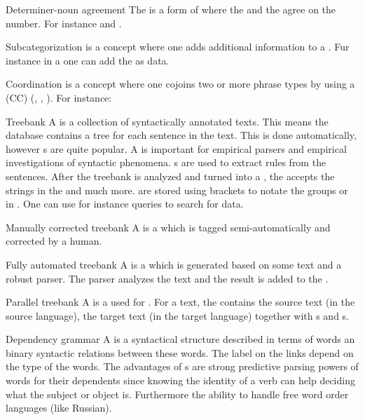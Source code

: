 \begin{df}{Determiner-noun agreement}
The \sb{} is a form of  where the  and the  agree on the number. For instance  and .
\end{df}
\begin{df}{Subcategorization}
\sb{} is a concept where one adds additional information to a . Fur instance in a  one can add the  as data.
\end{df}
\begin{df}{Coordination}
\sb{} is a concept where one cojoins two or more phrase types by using a  (CC) (, , ). For instance:
\end{df}
\begin{df}{Treebank}
A \sb{} is a collection of syntactically annotated texts. This means the database contains a tree for each sentence in the text. This is done automatically, however s are quite popular. A \sb{} is important for empirical parsers and empirical investigations of syntactic phenomena. \sb{}s are used to extract  rules from the sentences. After the treebank is analyzed and turned into a , the  accepts the strings in the \sb{} and much more. \sb{} are stored using brackets to notate the groups or in . One can use for instance  queries to search for data.
\end{df}
\begin{df}{Manually corrected treebank}
A \sb{} is a  which is tagged semi-automatically and corrected by a human.
\end{df}
\begin{df}{Fully automated treebank}
A \sb{} is a  which is generated based on some text and a robust parser. The parser analyzes the text and the result is added to the .
\end{df}
\begin{df}{Parallel treebank}
A \sb{} is a  used for . For a text, the  contains the source text (in the source language), the target text (in the target language) together with s and s.
\end{df}
\begin{df}{Dependency grammar}
A \sb{} is a syntactical structure described in terms of words an binary syntactic relations between these words. The label on the links depend on the type of the words. The advantages of \sb{}s are strong predictive parsing powers of words for their dependents since knowing the identity of a verb can help deciding what the subject or object is. Furthermore the ability to handle free word order languages (like Russian).
\end{df}
